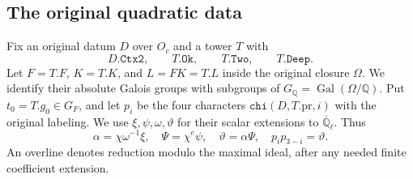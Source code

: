 \subsection{The original quadratic data}

Fix an original datum $D$ over $O_c$ and a tower $T$ with
\[
 D.\texttt{Ctx2},\qquad T.\texttt{Ok},\qquad
 T.\texttt{Two},\qquad T.\texttt{Deep}.             \tag{SX.2}
\]
Let $F=T.F$, $K=T.K$, and $L=FK=T.L$ inside the original closure
$\Omega$.  We identify their absolute Galois groups with subgroups
of $G_{\mathbb Q}=\operatorname{Gal}(\Omega/\mathbb Q)$.
Put $t_0=T.g_0\in G_F$, and let $p_i$ be the four characters
$\texttt{chi}(D,T.\mathrm{pr},i)$ with the original labeling.
We use $\xi,\psi,\omega,\vartheta$ for their scalar extensions to
$\overline{\mathbb Q}_\ell$.  Thus
\[
 \alpha=\chi\omega^{-1}\xi,
 \quad \Psi=\chi^e\psi,
 \quad \vartheta=\alpha\Psi,
 \quad p_i p_{3-i}=\vartheta.                         \tag{SX.3}
\]
An overline denotes reduction modulo the maximal ideal, after any
needed finite coefficient extension.

